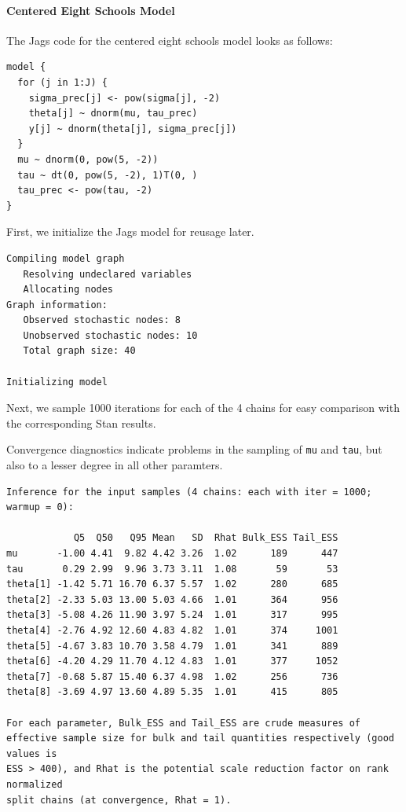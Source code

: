 \documentclass[american,]{article}
\let\oldparagraph\paragraph
\renewcommand{\paragraph}[1]{\oldparagraph{#1}\mbox{}}
\begin{document}
\hypertarget{centered-eight-schools-model-1}{%
\paragraph{Centered Eight Schools
Model}\label{centered-eight-schools-model-1}}

The Jags code for the centered eight schools model looks as follows:

\begin{verbatim}
model {
  for (j in 1:J) {
    sigma_prec[j] <- pow(sigma[j], -2)
    theta[j] ~ dnorm(mu, tau_prec)
    y[j] ~ dnorm(theta[j], sigma_prec[j])
  }
  mu ~ dnorm(0, pow(5, -2))
  tau ~ dt(0, pow(5, -2), 1)T(0, )
  tau_prec <- pow(tau, -2)
}
\end{verbatim}

First, we initialize the Jags model for reusage later.

\begin{verbatim}
Compiling model graph
   Resolving undeclared variables
   Allocating nodes
Graph information:
   Observed stochastic nodes: 8
   Unobserved stochastic nodes: 10
   Total graph size: 40

Initializing model
\end{verbatim}

Next, we sample 1000 iterations for each of the 4 chains for easy
comparison with the corresponding Stan results.

Convergence diagnostics indicate problems in the sampling of \texttt{mu}
and \texttt{tau}, but also to a lesser degree in all other paramters.

\begin{verbatim}
Inference for the input samples (4 chains: each with iter = 1000; warmup = 0):

            Q5  Q50   Q95 Mean   SD  Rhat Bulk_ESS Tail_ESS
mu       -1.00 4.41  9.82 4.42 3.26  1.02      189      447
tau       0.29 2.99  9.96 3.73 3.11  1.08       59       53
theta[1] -1.42 5.71 16.70 6.37 5.57  1.02      280      685
theta[2] -2.33 5.03 13.00 5.03 4.66  1.01      364      956
theta[3] -5.08 4.26 11.90 3.97 5.24  1.01      317      995
theta[4] -2.76 4.92 12.60 4.83 4.82  1.01      374     1001
theta[5] -4.67 3.83 10.70 3.58 4.79  1.01      341      889
theta[6] -4.20 4.29 11.70 4.12 4.83  1.01      377     1052
theta[7] -0.68 5.87 15.40 6.37 4.98  1.02      256      736
theta[8] -3.69 4.97 13.60 4.89 5.35  1.01      415      805

For each parameter, Bulk_ESS and Tail_ESS are crude measures of 
effective sample size for bulk and tail quantities respectively (good values is 
ESS > 400), and Rhat is the potential scale reduction factor on rank normalized
split chains (at convergence, Rhat = 1).
\end{verbatim}
\end{document}
